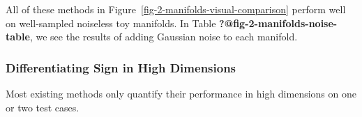 \documentclass[
  letterpaper,
  DIV=11,
  numbers=noendperiod]{scrartcl}
\theoremstyle{plain}
\theoremstyle{definition}
\theoremstyle{plain}
\theoremstyle{definition}
\theoremstyle{plain}
\theoremstyle{remark}
\begin{document}
All of these methods in Figure~\ref{fig-2-manifolds-visual-comparison}
perform well on well-sampled noiseless toy manifolds. In Table
\textbf{?@fig-2-manifolds-noise-table}, we see the results of adding
Gaussian noise to each manifold.

\subsubsection{Differentiating Sign in High
Dimensions}\label{differentiating-sign-in-high-dimensions}

Most existing methods only quantify their performance in high dimensions
on one or two test cases.

\begin{figure}[H]

\end{figure}
\end{document}
